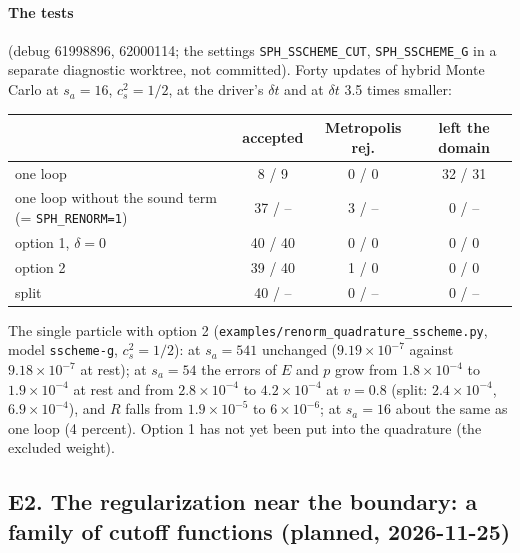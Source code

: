 \documentclass[11pt,aps,preprint,nofootinbib,superscriptaddress,tightenlines]{revtex4-2}
\let\oldparagraph\paragraph
\renewcommand{\paragraph}{\par\bigskip\oldparagraph}
\begin{document}
\paragraph{The tests} (debug 61998896, 62000114; the settings \texttt{SPH\_SSCHEME\_CUT}, \texttt{SPH\_SSCHEME\_G} in a separate diagnostic worktree,
not committed).  Forty updates of hybrid Monte Carlo at $s_a=16$, $c_s^2=1/2$, at the driver's $\delta t$ and at $\delta t$ 3.5 times smaller:
\begin{center}\small
\begin{tabular}{lccc}
\toprule
 & accepted & Metropolis rej. & left the domain \\
\midrule
one loop & 8 / 9 & 0 / 0 & 32 / 31 \\
one loop without the sound term (= \texttt{SPH\_RENORM=1}) & 37 / -- & 3 / -- & 0 / -- \\
option 1, $\delta=0$ & 40 / 40 & 0 / 0 & 0 / 0 \\
option 2 & 39 / 40 & 1 / 0 & 0 / 0 \\
split & 40 / -- & 0 / -- & 0 / -- \\
\bottomrule
\end{tabular}
\end{center}
The single particle with option 2 (\nolinkurl{examples/renorm_quadrature_sscheme.py}, model \texttt{sscheme-g}, $c_s^2=1/2$): at $s_a=541$ unchanged
($9.19\times10^{-7}$ against $9.18\times10^{-7}$ at rest); at $s_a=54$ the errors of $E$ and $p$ grow from $1.8\times10^{-4}$ to $1.9\times10^{-4}$ at rest
and from $2.8\times10^{-4}$ to $4.2\times10^{-4}$ at $v=0.8$ (split: $2.4\times10^{-4}$, $6.9\times10^{-4}$), and $R$ falls from $1.9\times10^{-5}$ to
$6\times10^{-6}$; at $s_a=16$ about the same as one loop (4 percent).  Option 1 has not yet been put into the quadrature (the excluded weight).

\subsection*{E2. The regularization near the boundary: a family of cutoff functions (planned, 2026-11-25)}
\end{document}
